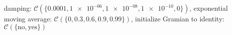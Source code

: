 damping: $\mathcal{C}(\{\num[scientific-notation=true]{0.0001},\num[scientific-notation=true]{1e-06},\num[scientific-notation=true]{1e-08},\num[scientific-notation=true]{1e-10},0\})$, exponential moving average: $\mathcal{C}(\{0,\num[scientific-notation=true]{0.3},\num[scientific-notation=true]{0.6},\num[scientific-notation=true]{0.9},\num[scientific-notation=true]{0.99}\})$, initialize Gramian to identity: $\mathcal{C}(\{\text{no},\text{yes}\})$